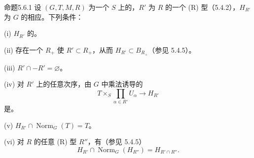 \begin{SGAresult}{命题}{5.6.1}
设 $(G,T,M,R)$ 为一个 $S$ 上的，$R'$ 为 $R$ 的一个 (R) 型（5.4.2），$H_{R'}$ 为 $G$ 的相应。下列条件：

(i) $H_{R'}$ 的。

(ii) 存在一个 $R_+$ 使 $R'\subset R_+$，从而 $H_{R'}\subset B_{R_+}$（参见 5.4.5）。

(iii) $R'\cap -R'=\varnothing$。

(iv) 对 $R'$ 上的任意次序，由 $G$ 中乘法诱导的
\[T\times_S\prod_{\alpha\in R'}U_\alpha\longrightarrow H_{R'}\]
是。

(v) $H_{R'}\cap\operatorname{Norm}_G(T)=T$。

(vi) 对 $R$ 的任意 (R) 型 $R''$，有（参见 5.4.5）
\[H_{R'}\cap\operatorname{Norm}_G(H_{R''})=H_{R'\cap R''}.\]
\end{SGAresult}
